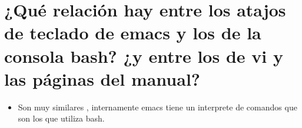 \section[Opcional 2]{¿Qué relación hay entre los atajos de teclado de emacs y los de la consola bash? ¿y entre los de vi y las páginas del manual?}

\begin{itemize}
	\item Son muy similares , internamente emacs tiene un interprete de comandos que son los que utiliza bash. 
	
\end{itemize}





